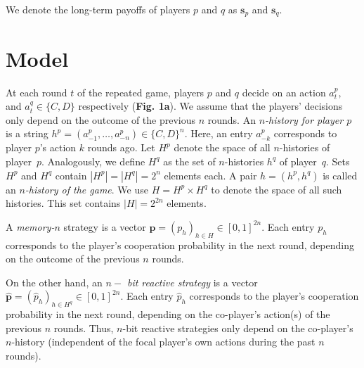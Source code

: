 \documentclass{article}
\theoremstyle{definition}
\begin{document}
We denote the long-term payoffs of players \(p\) and \(q\) as \(\mathbf{s}_{p}\)
and \(\mathbf{s}_{q}\).

\section{Model}

At each round \(t\) of the repeated game, players \(p\) and \(q\) decide on an
action \(a^{p}_{t},\) and \(a^{q}_{t} \in \{C, D\}\) respectively (\textbf{Fig.
1a}). We assume that the players' decisions only depend on the outcome of the
previous \(n\) rounds. An {\it $n$-history for player $p$} is a string
$h^p=(a^p_{-1},\ldots,a^p_{-n})\!\in\!\{C,D\}^n$. Here, an entry $a^p_{-k}$
corresponds to player $p$'s action $k$ rounds ago. Let $H^p$ denote the space of
all $n$-histories of player~$p$. Analogously, we define $H^q$ as the set of
$n$-histories $h^q$ of player~$q$. Sets $H^p$ and $H^q$ contain
$|H^p|=|H^q|=2^{n}$ elements each. A pair $h\!=\!(h^p,h^q)$ is called an {\it
$n$-history of the game}. We use $H=H^p\times H^q$ to denote the space of all
such histories. This set contains $|H|=2^{2n}$ elements.

A {\it memory-$n$} strategy is a vector $\mathbf{p}=(p_h)_{h\in
H}\in[0,1]^{2n}$. Each entry $p_h$ corresponds to the player's cooperation
probability in the next round, depending on the outcome of the previous $n$
rounds.

On the other hand, an {\it $n-$ bit reactive strategy} is a vector
$\mathbf{\hat{p}}=(\hat{p}_h)_{h\in H^q}\in[0,1]^{2n}$. Each entry $\hat{p}_h$
corresponds to the player's cooperation probability in the next round,
depending on the co-player's action(s) of the previous \(n\) rounds. Thus,
\(n\)-bit reactive strategies only depend on the co-player's \(n\)-history
(independent of the focal player's own actions during the past \(n\) rounds).
\end{document}

